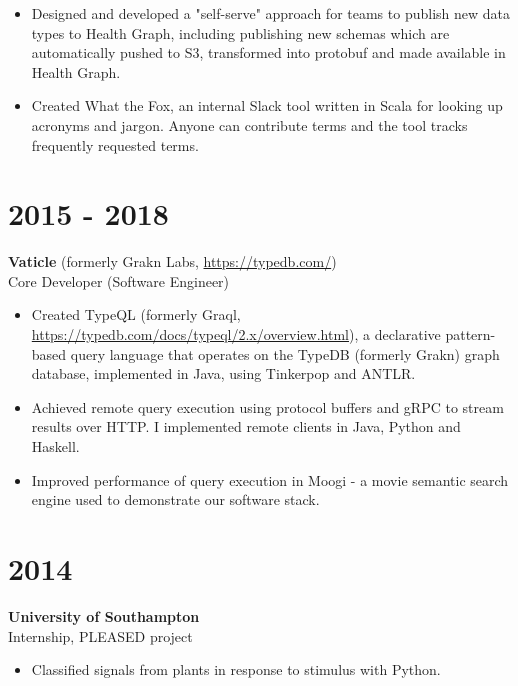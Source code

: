 \documentclass[margin]{res}
\begin{document}
\begin{resume}
\begin{itemize}
\item
Designed and developed a "self-serve" approach for teams to publish new data types to Health Graph, including publishing new schemas which are automatically pushed to S3, transformed into protobuf and made available in Health Graph.

\item
Created What the Fox, an internal Slack tool written in Scala for looking up acronyms and jargon. Anyone can contribute terms and the tool tracks frequently requested terms.

\end{itemize}

\normalsize{\section{2015 - 2018}}
{\bf Vaticle} (formerly Grakn Labs, \href{https://typedb.com/}{https://typedb.com/}) \\
Core Developer (Software Engineer)
\begin{itemize}

\item
Created TypeQL (formerly Graql, \href{https://typedb.com/docs/typeql/2.x/overview.html}{https://typedb.com/docs/typeql/2.x/overview.html}), a declarative pattern-based query language that operates on the TypeDB (formerly Grakn) graph database, implemented in Java, using Tinkerpop and ANTLR.

\item
Achieved remote query execution using protocol buffers and gRPC to stream results over HTTP. I implemented remote clients in Java, Python and Haskell.

\item
Improved performance of query execution in Moogi - a movie semantic search engine used to demonstrate our software stack.

\end{itemize}

\normalsize{\section{2014}}
{\bf University of Southampton} \\
Internship, PLEASED project

\begin{itemize}

\item
Classified signals from plants in response to stimulus with Python.


\end{itemize}
\end{resume}
\end{document}
